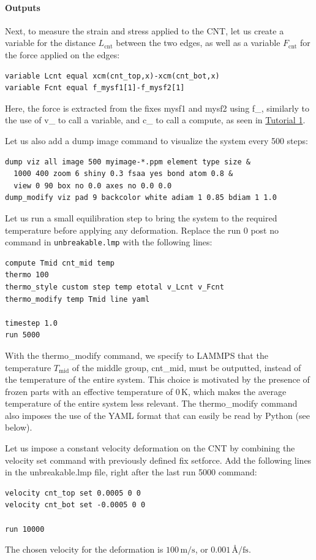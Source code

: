 \documentclass[9pt,tutorial]{livecoms}
\newcommand{\lmpcmd}[1]{\hspace{0pt}\colorbox{listing}{\textcolor{command}{\small{#1}}}\hspace{0pt}} %
\newcommand{\flecmd}[1]{\textcolor{command}{\texttt{#1}}} %
\begin{document}
\paragraph{Outputs}

Next, to measure the strain and stress applied to the CNT, let us create a
variable for the distance $L_\text{cnt}$ between the two edges,
as well as a variable $F_\text{cnt}$ for the force applied on the edges:
\begin{lstlisting}
variable Lcnt equal xcm(cnt_top,x)-xcm(cnt_bot,x)
variable Fcnt equal f_mysf1[1]-f_mysf2[1]
\end{lstlisting}
Here, the force is extracted from the fixes \lmpcmd{mysf1} and \lmpcmd{mysf2}
using \lmpcmd{f\_}, similarly to the use of \lmpcmd{v\_} to call a variable,
and \lmpcmd{c\_} to call a compute, as seen in \hyperref[lennard-jones-label]{Tutorial 1}.

Let us also add a \lmpcmd{dump image} command to visualize the system
every 500 steps:
\begin{lstlisting}
dump viz all image 500 myimage-*.ppm element type size &
  1000 400 zoom 6 shiny 0.3 fsaa yes bond atom 0.8 &
  view 0 90 box no 0.0 axes no 0.0 0.0
dump_modify viz pad 9 backcolor white adiam 1 0.85 bdiam 1 1.0
\end{lstlisting}
Let us run a small equilibration step to bring the system to the required
temperature before applying any deformation.  Replace the \lmpcmd{run 0 post no}
command in \flecmd{unbreakable.lmp} with the following lines:
\begin{lstlisting}
compute Tmid cnt_mid temp
thermo 100
thermo_style custom step temp etotal v_Lcnt v_Fcnt
thermo_modify temp Tmid line yaml

timestep 1.0
run 5000
\end{lstlisting}
With the \lmpcmd{thermo\_modify} command, we specify to LAMMPS that the
temperature $T_\mathrm{mid}$ of the middle group, \lmpcmd{cnt\_mid},
must be outputted, instead of the temperature of the entire system.
This choice is motivated by the presence of
frozen parts with an effective temperature of 0\,K, which makes the average
temperature of the entire system less relevant.  The \lmpcmd{thermo\_modify}
command also imposes the use of the YAML format that can easily be read by
Python (see below).

Let us impose a constant velocity deformation on the CNT
by combining the \lmpcmd{velocity set} command with previously defined
\lmpcmd{fix setforce}.  Add the following lines in the \lmpcmd{unbreakable.lmp}
file, right after the last \lmpcmd{run 5000} command:
\begin{lstlisting}
velocity cnt_top set 0.0005 0 0
velocity cnt_bot set -0.0005 0 0

run 10000
\end{lstlisting}
The chosen velocity for the deformation is $100\,\text{m/s}$, or
$0.001\,\text{\AA{}/fs}$.
\end{document}
